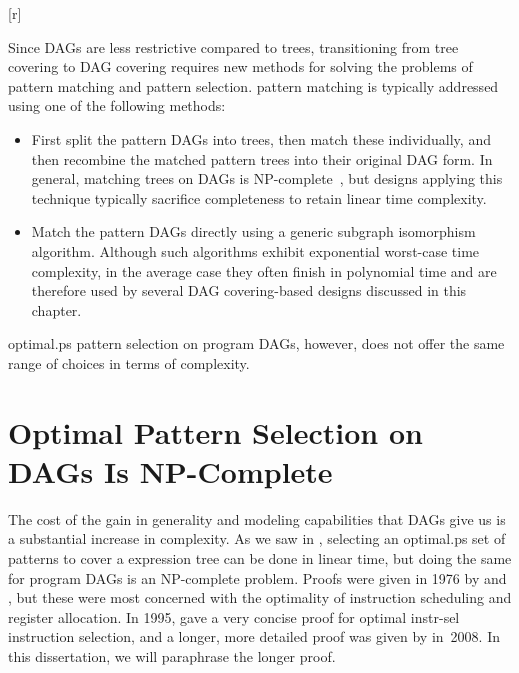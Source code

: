 \begin{inParFigure}{\inparfigwidth}[r]%
  \vspace*{2\baselineskip}
\end{inParFigure}%
Since \glspl{DAG} are less restrictive compared to \glspl{tree}, transitioning
from \gls{tree covering} to \gls{DAG covering} requires new methods for solving
the problems of \gls{pattern matching} and \gls{pattern selection}.
%
\Gls{pattern
  matching} is typically addressed using one of the following methods:
\begin{itemize}
  \item First split the \glspl{pattern DAG} into \glspl{tree}, then match these
    individually, and then recombine the matched \glspl{pattern tree} into their
    original \gls{DAG} form.
%
In general, matching \glspl{tree} on \glspl{DAG} is
    NP-complete~\cite{Garey1979}, but designs applying this technique
    typically sacrifice completeness to retain linear time complexity.
  \item Match the \glspl{pattern DAG} directly using a generic \gls{subgraph
    isomorphism} algorithm.
%
Although such algorithms exhibit exponential
    worst-case time complexity, in the average case they often finish in
    polynomial time and are therefore used by several \gls{DAG covering}-based
    designs discussed in this chapter.
\end{itemize}

\Gls{optimal.ps} \gls{pattern selection} on \glspl{program DAG}, however,
does not offer the same range of choices in terms of complexity.


\section{Optimal Pattern Selection on DAGs Is NP-Complete}

The cost of the gain in generality and modeling capabilities that \glspl{DAG}
give us is a substantial increase in complexity.
%
As we saw in
, selecting an \gls{optimal.ps} set of
\glspl{pattern} to cover a \gls{expression tree} can be done in linear time, but
doing the same for \glspl{program DAG} is an NP-complete problem.
%
Proofs
were given in 1976 by \textcite{Bruno1976} and \textcite{Aho1976b}, but
these were most concerned with the optimality of \gls{instruction scheduling}
and \gls{register allocation}.
%
In 1995, \textcite{Proebsting1995b} gave a very
concise proof for \gls{optimal instr-sel} \gls{instruction selection}, and
a longer, more detailed proof was given by \textcite{Koes2008} in~2008.
%
In this
dissertation, we will paraphrase the longer proof.


